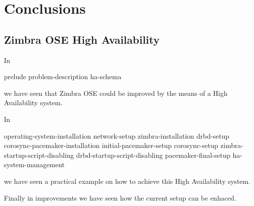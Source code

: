 

\chapter{Conclusions}

\section {Zimbra OSE High Availability}
In 

{prelude}
{problem-description}
{ha-schema}

we have seen that Zimbra OSE could be improved by the means of a High Availability system.

In 

{operating-system-installation}
{network-setup}
{zimbra-installation}
{drbd-setup}
{corosync-pacemaker-installation}
{initial-pacemaker-setup}
{corosync-setup}
{zimbra-startup-script-disabling}
{drbd-startup-script-disabling}
{pacemaker-final-setup}
{ha-system-management}

we have seen a practical example on how to achieve this High Availability system.

Finally in {improvements} we have seen how the current setup can be enhaced.



